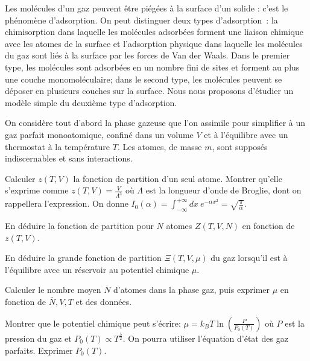 Les molécules d'un gaz peuvent être piégées à la surface d'un solide : c'est le phénomène d'adsorption. On peut distinguer deux types d'adsorption~: la chimisorption dans laquelle les molécules adsorbées forment une liaison chimique avec les atomes de la surface et l'adsorption physique dans laquelle les molécules du gaz sont liés à la surface par les forces de Van der Waals. Dans le premier type, les molécules sont adsorbées en un nombre fini de sites et forment au plus une couche monomoléculaire; dans le second type, les molécules peuvent se déposer en plusieurs couches sur la surface. Nous nous proposons d'étudier un modèle simple du deuxième type d’adsorption.

\medskip


\smallskip

On considère tout d'abord la phase gazeuse que l'on assimile pour simplifier à un gaz 
parfait monoatomique, confiné dans un volume $V$ et à l'équilibre avec un thermostat à la température $T$. Les atomes, de masse $m$, sont supposés indiscernables et sans interactions.

\question Calculer $z(T,V)$ la fonction de partition d'un seul atome. Montrer qu'elle s'exprime comme $z(T,V)=\frac{V}{\Lambda^3}$ où $\Lambda$ est la longueur d'onde de Broglie, dont on rappellera l'expression. On donne $I_0(\alpha)=\int_{-\infty}^{+\infty} dx \ e^{-\alpha x^2}=\sqrt{\frac{\pi}{\alpha}}$.

\question En déduire la fonction de partition pour $N$ atomes $Z(T,V,N)$ en fonction de $z(T,V)$.

\question En déduire la grande fonction de partition $\Xi(T,V,\mu)$ du gaz lorsqu'il est à l'équilibre avec un réservoir au potentiel chimique $\mu$.

\question Calculer le nombre moyen $\overline{N}$ d'atomes dans la phase gaz, puis exprimer $\mu$ en fonction de $\overline{N}, V, T$ et des données.

\question Montrer que le potentiel chimique peut s'écrire: $\mu=k_B T \ln \left( \frac{P}{P_0(T)} \right)$ où $P$ est la pression du gaz et $P_0(T) \propto T^{\frac{5}{2}}.$ On pourra utiliser l'équation d'état des gaz parfaits. Exprimer $P_0(T)$.

\medskip


\smallskip

